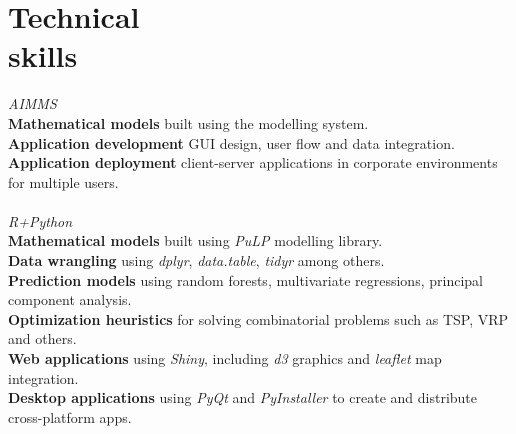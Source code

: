    			  
		\section{Technical \\ skills}

        \textsl{AIMMS}\\
					\hspace*{2ex}\textbf{Mathematical models} built using the modelling system.\\
					\hspace*{2ex}\textbf{Application development} GUI design, user flow and data integration.\\
					\hspace*{2ex}\textbf{Application deployment} client-server applications in corporate environments for multiple users.\\
        \\\textsl{R+Python}\\
					\hspace*{2ex}\textbf{Mathematical models} built using \textit{PuLP} modelling library.\\
					\hspace*{2ex}\textbf{Data wrangling} using \textit{dplyr}, \textit{data.table}, \textit{tidyr} among others.\\
					\hspace*{2ex}\textbf{Prediction models} using random forests, multivariate regressions, principal component analysis.\\
					\hspace*{2ex}\textbf{Optimization heuristics} for solving combinatorial problems such as TSP, VRP and others.\\
					\hspace*{2ex}\textbf{Web applications} using \textit{Shiny}, including \textit{d3} graphics and \textit{leaflet} map integration.\\
					\hspace*{2ex}\textbf{Desktop applications} using \textit{PyQt} and \textit{PyInstaller} to create and distribute cross-platform apps.\\
